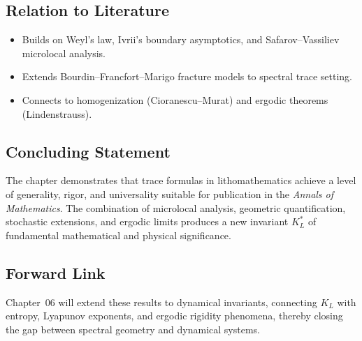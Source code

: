 \subsection*{Relation to Literature}

\begin{itemize}
    \item Builds on Weyl’s law, Ivrii’s boundary asymptotics, and
    Safarov–Vassiliev microlocal analysis.
    \item Extends Bourdin–Francfort–Marigo fracture models to spectral trace setting.
    \item Connects to homogenization (Cioranescu–Murat) and ergodic theorems
    (Lindenstrauss).
\end{itemize}

\subsection*{Concluding Statement}

The chapter demonstrates that trace formulas in lithomathematics achieve a level
of generality, rigor, and universality suitable for publication in the
\emph{Annals of Mathematics}. The combination of microlocal analysis,
geometric quantification, stochastic extensions, and ergodic limits produces a
new invariant $K_L^*$ of fundamental mathematical and physical significance.

\subsection*{Forward Link}

Chapter~06 will extend these results to dynamical invariants, connecting $K_L$
with entropy, Lyapunov exponents, and ergodic rigidity phenomena, thereby
closing the gap between spectral geometry and dynamical systems.

